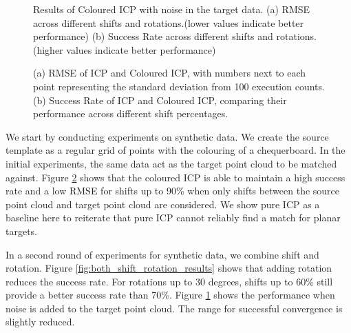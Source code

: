 \begin{figure}[t]

    \caption{Results of Coloured ICP with noise in the target data. (a) RMSE across different shifts and rotations.(lower values indicate better performance) (b) Success Rate across different shifts and rotations.(higher values indicate better performance)}
    \label{fig:both_shift_rotation_noise_results}
\end{figure}

\begin{figure}[!ht]

    \caption{(a) RMSE of ICP and Coloured ICP, with numbers next to each point representing the standard deviation from 100 execution counts. (b) Success Rate of ICP and Coloured ICP, comparing their performance across different shift percentages.}
    \label{fig:only_shift_results}
\end{figure}

We start by conducting experiments on synthetic data. We create the source template as a regular grid of points with the colouring of a chequerboard. In the initial experiments, the same data act as the target point cloud to be matched against. Figure \ref{fig:only_shift_results} shows that the coloured ICP is able to maintain a high success rate and a low RMSE for shifts up to 90\% when only shifts between the source point cloud and target point cloud are considered. We show pure ICP as a baseline here to reiterate that pure ICP cannot reliably find a match for planar targets.

In a second round of experiments for synthetic data, we combine shift and rotation. Figure \ref{fig:both_shift_rotation_results} shows that adding rotation reduces the success rate. For rotations up to 30 degrees, shifts up to 60\% still provide a better success rate than 70\%. Figure \ref{fig:both_shift_rotation_noise_results} shows the performance when noise is added to the target point cloud. The range for successful convergence is slightly reduced.


